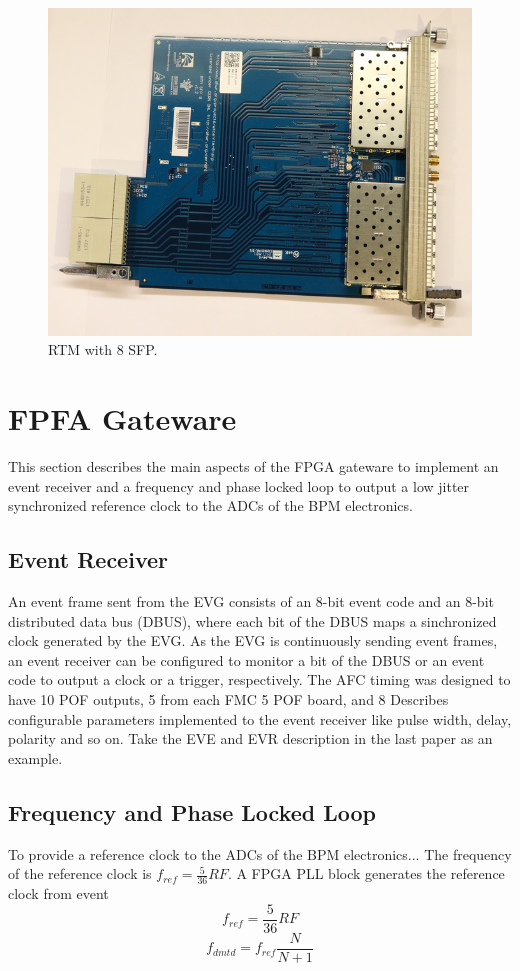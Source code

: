 \documentclass[a4paper,
               biblatex,      %
               ]{jacow}
\begin{document}
\begin{figure}[!htb]
   \centering
   \includegraphics*[width=0.8\columnwidth]{RTM_SFP_resized}
   \caption{RTM with 8 SFP.}
   \label{fig:rtm_sfp}
\end{figure}

\section{FPFA Gateware}

This section describes the main aspects of the FPGA gateware to implement an event receiver and a frequency and phase locked loop to output a low jitter synchronized reference clock to the ADCs of the BPM electronics.

\subsection{Event Receiver}

An event frame sent from the EVG consists of an 8-bit event code and an 8-bit distributed data bus (DBUS), where each bit of the DBUS maps a sinchronized clock generated by the EVG.
As the EVG is continuously sending event frames, an event receiver can be configured to monitor a bit of the DBUS or an event code to output a clock or a trigger, respectively. 
The AFC timing was designed to have 10 POF outputs, 5 from each FMC 5 POF board, and 8 
Describes configurable parameters implemented to the event receiver like pulse width, delay, polarity and so on. Take the EVE and EVR description in the last paper as an example.

\subsection{Frequency and Phase Locked Loop}
To provide a reference clock to the ADCs of the BPM electronics... 
The frequency of the reference clock is $f_{ref}=\frac{5}{36}RF$.
A FPGA PLL block generates the reference clock from event
\[f_{ref}=\frac{5}{36}RF\]
\[f_{dmtd} = f_{ref}\frac{N}{N+1}\]
\end{document}
